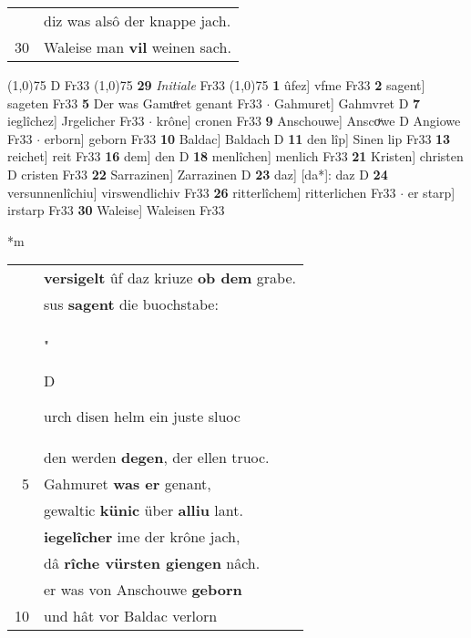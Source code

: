 \documentclass[8pt,a4paper,notitlepage]{article}
\begin{document}
\begin{table}[ht]
\begin{minipage}[t]{0.5\linewidth}
\begin{tabular}{rl}
 & diz was alsô der knappe jach.\\ 
30 & Waleise man \textbf{vil} weinen sach.\\ 
\end{tabular}
\scriptsize
\line(1,0){75} \newline
D Fr33 \newline
\line(1,0){75} \newline
\textbf{29} \textit{Initiale} Fr33  \newline
\line(1,0){75} \newline
\textbf{1} ûfez] vfme Fr33 \textbf{2} sagent] sageten Fr33 \textbf{5} Der was Gamuͦret genant Fr33  $\cdot$ Gahmuret] Gahmvret D \textbf{7} ieglîchez] Jrgelicher Fr33  $\cdot$ krône] cronen Fr33 \textbf{9} Anschouwe] Anscoͮwe D Angiowe Fr33  $\cdot$ erborn] geborn Fr33 \textbf{10} Baldac] Baldach D \textbf{11} den lîp] Sinen lip Fr33 \textbf{13} reichet] reit Fr33 \textbf{16} dem] den D \textbf{18} menlîchen] menlich Fr33 \textbf{21} Kristen] christen D cristen Fr33 \textbf{22} Sarrazinen] Zarrazinen D \textbf{23} daz] [da*]: daz D \textbf{24} versunnenlîchiu] virswendlichiv Fr33 \textbf{26} ritterlîchem] ritterlichen Fr33  $\cdot$ er starp] irstarp Fr33 \textbf{30} Waleise] Waleisen Fr33 \newline
\end{minipage}
\hspace{0.5cm}
\begin{minipage}[t]{0.5\linewidth}
\small
\begin{center}*m
\end{center}
\begin{tabular}{rl}
 & \textbf{versigelt} ûf daz kriuze \textbf{ob dem} grabe.\\ 
 & sus \textbf{sagent} die buochstabe:\\ 
 & "\begin{large}D\end{large}urch disen helm ein juste sluoc\\ 
 & den werden \textbf{degen}, der ellen truoc.\\ 
5 & Gahmuret \textbf{was er} genant,\\ 
 & gewaltic \textbf{künic} über \textbf{alliu} lant.\\ 
 & \textbf{iegelîcher} ime der krône jach,\\ 
 & dâ \textbf{rîche vürsten giengen} nâch.\\ 
 & er was von Anschouwe \textbf{geborn}\\ 
10 & und hât vor Baldac verlorn\\ 

\end{tabular}
\end{minipage}
\end{table}
\end{document}
